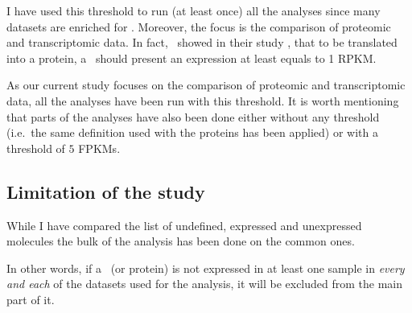 I have used this threshold to run (at least once) all the analyses since
many datasets are enriched for \mRNAs. Moreover, the 
focus is the comparison of proteomic and
transcriptomic data. In fact,~\citet{Hebenstreit:2011} showed in their study
, that to be translated into a protein,
a \mRNA\ should present an expression at least equals to 1 \gls{RPKM}.

As our current study focuses on the comparison of proteomic and transcriptomic
data, all the analyses have been run with this threshold. It is worth mentioning
that parts of the analyses have also been done either without
any threshold (i.e.\ the same definition used with the proteins has been applied)
or with a threshold of $5$ \glspl{FPKM}.

\subsection{Limitation of the study}
While I have compared the list of undefined, expressed and unexpressed molecules
the bulk of the analysis has been done on the common ones.

In other words, if a \mRNA\ (or protein) is not expressed in at least one sample
in \emph{every and each} of the datasets used for the analysis,
it will be excluded from the main part of it.
